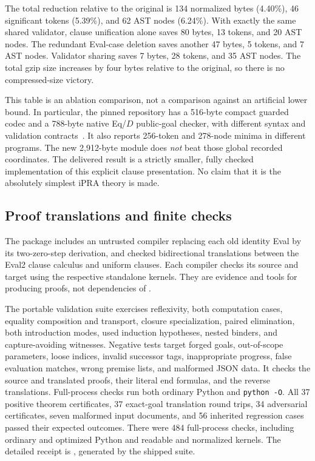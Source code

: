 \documentclass[11pt,letterpaper]{article}
\theoremstyle{definition}\newtheorem{definition}[theorem]{Definition}
\begin{document}
The total reduction relative to the original is 134 normalized bytes
(4.40\%), 46 significant tokens (5.39\%), and 62 AST nodes (6.24\%).
With exactly the same shared validator, clause unification alone saves
80 bytes, 13 tokens, and 20 AST nodes. The redundant Eval-case deletion
saves another 47 bytes, 5 tokens, and 7 AST nodes. Validator sharing saves
7 bytes, 28 tokens, and 35 AST nodes. The total gzip size increases by
four bytes relative to the original, so there is no compressed-size victory.

This table is an ablation comparison, not a comparison against an artificial
lower bound. In particular, the pinned repository has a 516-byte compact
guarded codec and a 788-byte native Eq/$D$ public-goal checker, with different
syntax and validation contracts~\cite{overview}. It also reports 256-token
and 278-node minima in different programs. The new 2,912-byte module does
\emph{not} beat those global recorded coordinates. The delivered result is
a strictly smaller, fully checked implementation of this explicit clause
presentation. No claim that it is the absolutely simplest iPRA theory is made.

\subsection{Proof translations and finite checks}

The package includes an untrusted compiler replacing each old identity Eval
by its two-zero-step derivation, and checked bidirectional translations
between the Eval2 clause calculus and uniform clauses. Each compiler checks
its source and target using the respective standalone kernels. They are
evidence and tools for producing proofs, not dependencies of
.

The portable validation suite exercises reflexivity, both computation
cases, equality composition and transport, closure specialization, paired
elimination, both introduction modes, used induction hypotheses, nested
binders, and capture-avoiding witnesses. Negative tests target forged goals,
out-of-scope parameters, loose indices, invalid successor tags, inappropriate
progress, false evaluation matches, wrong premise lists, and malformed JSON
data. It checks the source and translated proofs, their literal end formulas,
and the reverse translations. Full-process checks run both ordinary Python
and \texttt{python -O}. All 37 positive theorem certificates, 37 exact-goal
translation round trips, 34 adversarial certificates, seven malformed input
documents, and 56 inherited regression cases passed their expected outcomes.
There were 484 full-process checks, including ordinary and optimized Python
and readable and normalized kernels. The detailed receipt is
, generated by the shipped suite.
\end{document}
